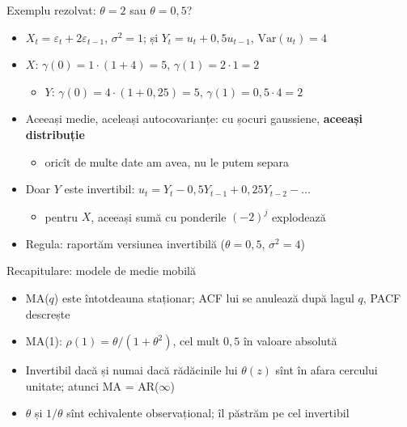 \begin{frame}{Exemplu rezolvat: $\theta = 2$ sau $\theta = 0{,}5$?}
\itemsize{\small}
\begin{itemize}
    \item $X_t = \varepsilon_t + 2\varepsilon_{t-1}$, $\sigma^2 = 1$; și $Y_t = u_t + 0{,}5u_{t-1}$, $\mathrm{Var}(u_t) = 4$
    \item $X$: $\gamma(0) = 1 \cdot (1 + 4) = 5$, $\gamma(1) = 2 \cdot 1 = 2$
    \begin{itemize}
        \item $Y$: $\gamma(0) = 4 \cdot (1 + 0{,}25) = 5$, $\gamma(1) = 0{,}5 \cdot 4 = 2$
    \end{itemize}
    \item Aceeași medie, aceleași autocovarianțe: cu șocuri gaussiene, \textbf{aceeași distribuție}
    \begin{itemize}
        \item oricît de multe date am avea, nu le putem separa
    \end{itemize}
    \item Doar $Y$ este invertibil: $u_t = Y_t - 0{,}5Y_{t-1} + 0{,}25Y_{t-2} - \dots$
    \begin{itemize}
        \item pentru $X$, aceeași sumă cu ponderile $(-2)^j$ explodează
    \end{itemize}
    \item Regula: raportăm versiunea invertibilă ($\theta = 0{,}5$, $\sigma^2 = 4$)
\end{itemize}
\end{frame}

\begin{frame}{Recapitulare: modele de medie mobilă}
\itemsize{\small}
\begin{itemize}
    \item MA($q$) este întotdeauna staționar; ACF lui se anulează după lagul $q$, PACF descrește
    \item MA(1): $\rho(1) = \theta/(1 + \theta^2)$, cel mult $0{,}5$ în valoare absolută
    \item Invertibil dacă și numai dacă rădăcinile lui $\theta(z)$ sînt în afara cercului unitate; atunci MA = AR($\infty$)
    \item $\theta$ și $1/\theta$ sînt echivalente observațional; îl păstrăm pe cel invertibil
\end{itemize}
\end{frame}


